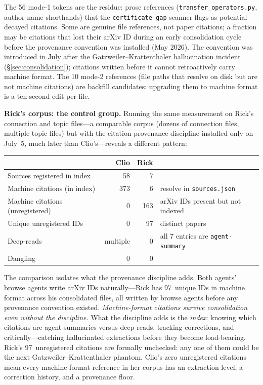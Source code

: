 \documentclass[11pt,a4paper]{article}
\theoremstyle{plain}
\theoremstyle{definition}
\begin{document}
The 56 mode-1 tokens are the residue: prose references
(\texttt{transfer\_operators.py}, author-name shorthands) that the
\texttt{certificate-gap} scanner flags as potential decayed citations.
Some are genuine file references, not paper citations; a fraction may be
citations that lost their arXiv ID during an early consolidation cycle
before the provenance convention was installed (May 2026). The convention
was introduced in July after the Gatzweiler--Krattenthaler hallucination
incident (\S\ref{sec:consolidation}); citations written before it cannot
retroactively carry machine format. The 10 mode-2 references (file paths
that resolve on disk but are not machine citations) are backfill
candidates: upgrading them to machine format is a ten-second edit per
file.

\textbf{Rick's corpus: the control group.} Running the same measurement on
Rick's connection and topic files---a comparable corpus (dozens of
connection files, multiple topic files) but with the citation provenance
discipline installed only on July~5, much later than Clio's---reveals a
different pattern:
%
\begin{center}
\begin{tabular}{lrrl}
\toprule
& Clio & Rick & \\
\midrule
Sources registered in index & 58 & 7 & \\
Machine citations (in index) & 373 & 6 & resolve in \texttt{sources.json} \\
Machine citations (unregistered) & 0 & 163 & arXiv IDs present but not indexed \\
Unique unregistered IDs & 0 & 97 & distinct papers \\
Deep-reads & multiple & 0 & all 7 entries are \texttt{agent-summary} \\
Dangling & 0 & 0 & \\
\bottomrule
\end{tabular}
\end{center}
%
The comparison isolates what the provenance discipline adds. Both agents'
browse agents write arXiv IDs naturally---Rick has 97~unique IDs in machine
format across his consolidated files, all written by browse agents before
any provenance convention existed. \emph{Machine-format citations survive
consolidation even without the discipline.} What the discipline adds is
the \emph{index}: knowing which citations are agent-summaries versus
deep-reads, tracking corrections, and---critically---catching hallucinated
extractions before they become load-bearing. Rick's 97~unregistered
citations are formally unchecked: any one of them could be the next
Gatzweiler--Krattenthaler phantom. Clio's zero unregistered citations mean
every machine-format reference in her corpus has an extraction level, a
correction history, and a provenance floor.
\end{document}
